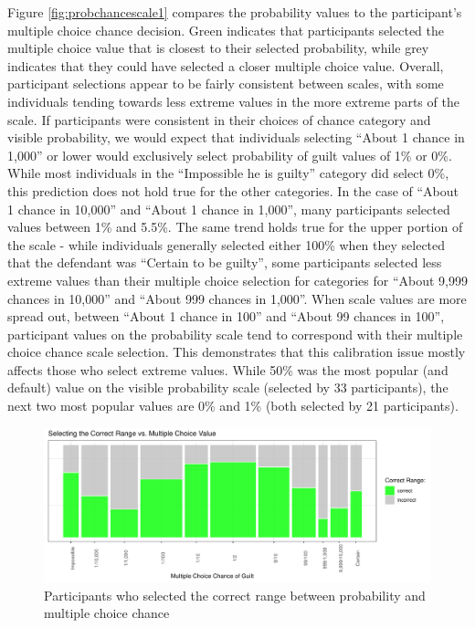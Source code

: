 \documentclass[print]{nuthesis}
\begin{document}
Figure \ref{fig:probchancescale1} compares the probability values to the participant's multiple choice chance decision.
Green indicates that participants selected the multiple choice value that is closest to their selected probability, while grey indicates that they could have selected a closer multiple choice value.
Overall, participant selections appear to be fairly consistent between scales, with some individuals tending towards less extreme values in the more extreme parts of the scale.
If participants were consistent in their choices of chance category and visible probability, we would expect that individuals selecting ``About 1 chance in 1,000'' or lower would exclusively select probability of guilt values of 1\% or 0\%.
While most individuals in the ``Impossible he is guilty'' category did select 0\%, this prediction does not hold true for the other categories.
In the case of ``About 1 chance in 10,000'' and ``About 1 chance in 1,000'', many participants selected values between 1\% and 5.5\%.
The same trend holds true for the upper portion of the scale - while individuals generally selected either 100\% when they selected that the defendant was ``Certain to be guilty'', some participants selected less extreme values than their multiple choice selection for categories for ``About 9,999 chances in 10,000'' and ``About 999 chances in 1,000''.
When scale values are more spread out, between ``About 1 chance in 100'' and ``About 99 chances in 100'', participant values on the probability scale tend to correspond with their multiple choice chance scale selection.
This demonstrates that this calibration issue mostly affects those who select extreme values.
While 50\% was the most popular (and default) value on the visible probability scale (selected by 33 participants), the next two most popular values are 0\% and 1\% (both selected by 21 participants).

\begin{figure}

{\centering \includegraphics[width=\linewidth]{thesis_files/figure-latex/correctprobmosaic-1} 

}

\caption{Participants who selected the correct range between probability and multiple choice chance}\label{fig:correctprobmosaic}
\end{figure}
\end{document}
